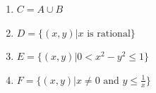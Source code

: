 \documentclass[
]{book}
\providecommand{\tightlist}{%
  \setlength{\itemsep}{0pt}\setlength{\parskip}{0pt}}
\theoremstyle{definition}
\theoremstyle{definition}
\theoremstyle{definition}
\theoremstyle{definition}
\theoremstyle{remark}
\begin{document}
\begin{enumerate}
\def\labelenumi{(\alph{enumi})}
\setcounter{enumi}{2}
\tightlist
\item
  \(C = A \cup B\)
\item
  \(D = \{(x, y) | x \text{ is rational}\}\)
\item
  \(E = \{(x, y) | 0 < x^2 - y^2 \leq 1\}\)
\item
  \(F = \{(x, y) | x \neq 0 \text{ and } y \leq \frac{1}{x}\}\)
\end{enumerate}

  
\end{document}
